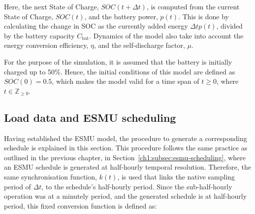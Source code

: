 %
%
%
%
%
%



Here, the next State of Charge, $SOC(t+\Delta t)$, is computed from the current State of Charge, $SOC(t)$, and the battery power, $p(t)$.
This is done by calculating the change in SOC as the currently added energy $\Delta t p(t)$, divided by the battery capacity $C_\text{bat}$.
Dynamics of the model also take into account the energy conversion efficiency, $\eta$, and the self-discharge factor, $\mu$.

For the purpose of the simulation, it is assumed that the battery is initially charged up to 50\%.
Hence, the initial conditions of this model are defined as $SOC(0) = 0.5$, which makes the model valid for a time span of $t \geq 0$, where $t \in \mathbb{Z}_{\geq0}$.

\subsection{Load data and ESMU scheduling}
\label{ch2:subsec:load-data-and-esmu-scheduling}


Having established the ESMU model, the procedure to generate a corresponding schedule is explained in this section.
This procedure follows the same practice as outlined in the previous chapter, in Section~\ref{ch1:subsec:esmu-scheduling}, where an ESMU schedule is generated at half-hourly temporal resolution.
Therefore, the same synchronisation function, $k(t)$, is used that links the native sampling period of $\Delta t$, to the schedule's half-hourly period.
Since the sub-half-hourly operation was at a minutely period, and the generated schedule is at half-hourly period, this fixed conversion function is defined as:

